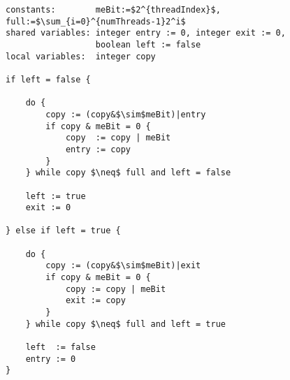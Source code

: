 \begin{lstlisting}[mathescape]
constants:        meBit:=$2^{threadIndex}$, full:=$\sum_{i=0}^{numThreads-1}2^i$
shared variables: integer entry := 0, integer exit := 0,
                  boolean left := false
local variables:  integer copy

if left = false {

	do {
		copy := (copy&$\sim$meBit)|entry
		if copy & meBit = 0 {
			copy  := copy | meBit
			entry := copy
		}
	} while copy $\neq$ full and left = false

	left := true
	exit := 0

} else if left = true {

	do {
		copy := (copy&$\sim$meBit)|exit
		if copy & meBit = 0 {
			copy := copy | meBit
			exit := copy
		}
	} while copy $\neq$ full and left = true

	left  := false
	entry := 0
}
\end{lstlisting}
